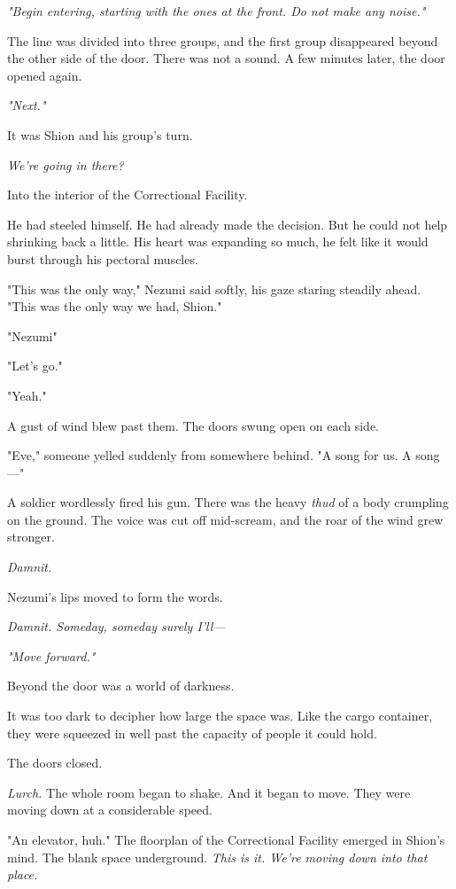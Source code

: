 \emph{"Begin entering, starting with the ones at the front. Do not make
any noise."}

The line was divided into three groups, and the first group disappeared
beyond the other side of the door. There was not a sound. A few minutes
later, the door opened again.

\emph{"Next."}

It was Shion and his group's turn.

\emph{We're going in there?}

Into the interior of the Correctional Facility.

He had steeled himself. He had already made the decision. But he could
not help shrinking back a little. His heart was expanding so much, he
felt like it would burst through his pectoral muscles.

"This was the only way," Nezumi said softly, his gaze staring steadily
ahead. "This was the only way we had, Shion."

"Nezumi\el "

"Let's go."

"Yeah."

A gust of wind blew past them. The doors swung open on each side.

"Eve," someone yelled suddenly from somewhere behind. "A song for us. A
song---"

A soldier wordlessly fired his gun. There was the heavy \emph{thud} of a body
crumpling on the ground. The voice was cut off mid-scream, and the roar
of the wind grew stronger.

\emph{Damnit.}

Nezumi's lips moved to form the words.

\emph{Damnit. Someday, someday surely I'll---}

\emph{"Move forward."}

Beyond the door was a world of darkness.

It was too dark to decipher how large the space was. Like the cargo
container, they were squeezed in well past the capacity of people it
could hold.

The doors closed.

\emph{Lurch.} The whole room began to shake. And it began to move. They
were moving down at a considerable speed.

"An elevator, huh." The floorplan of the Correctional Facility emerged
in Shion's mind. The blank space underground. \emph{This is it. We're
moving down into that place.}

